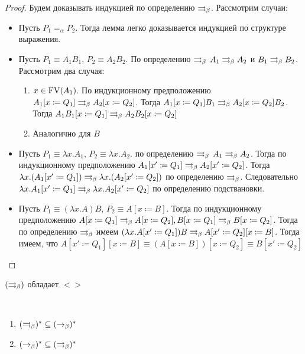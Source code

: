 \begin{proof}
	Будем доказывать индукцией по определению $\rightrightarrows_{\beta} $. Рассмотрим случаи:
	\begin{itemize}
		\item Пусть $P_{1}=_{\alpha}P_{2}$. Тогда лемма легко доказывается индукцией по структуре выражения.
		\item Пусть $P_{1}\equiv{}A_{1}B_{1}$, $P_{2}\equiv{}A_{2}B_{2}$. По определению $\rightrightarrows_{\beta}$ $A_{1} \rightrightarrows_{\beta} A_{2}$ и $B_{1} \rightrightarrows_{\beta} B_{2}$.
		Рассмотрим два случая:
		\begin{enumerate}
			\item $x \in \operatorname{FV}(A_{1})$. По индукционному предположению $A_{1}[x\coloneqq{}Q_{1}] \rightrightarrows_{\beta} A_{2}[x\coloneqq{}Q_{2}]$. Тогда $A_{1}[x\coloneqq{}Q_{1}]B_{1} \rightrightarrows_{\beta} A_{2}[x\coloneqq{}Q_{2}]B_{2}$. Тогда $A_{1}B_{1}[x\coloneqq{}Q_{1}] \rightrightarrows_{\beta} A_{2}B_{2}[x\coloneqq{}Q_{2}]$
			\item Аналогично для $B$
		\end{enumerate}
		\item Пусть $P_{1}\equiv{}\lambda{}x.A_{1}$, $P_{2}\equiv{}\lambda{}x.A_{2}$. по определению $\rightrightarrows_{\beta}$ $A_{1}\rightrightarrows_{\beta} A_{2}$. Тогда по индукционному предположению $A_{1}[x'\coloneqq{}Q_{1}] \rightrightarrows_{\beta} A_{2}[x'\coloneqq{}Q_{2}]$. Тогда 
		$\lambda{}x.(A_{1}[x'\coloneqq{}Q_{1}]) \rightrightarrows_{\beta} \lambda{}x.(A_{2}[x'\coloneqq{}Q_{2}])$ по определению $\rightrightarrows_{\beta}$. Следовательно 	$\lambda{}x.A_{1}[x'\coloneqq{}Q_{1}] \rightrightarrows_{\beta} \lambda{}x.A_{2}[x'\coloneqq{}Q_{2}]$ по определению подствановки.
		\item Пусть $P_{1}\equiv(\lambda{}x.A)B$, $P_{2}\equiv A[x\coloneqq{}B]$. Тогда по индукционному предположению $A[x\coloneq{}Q_{1}] \rightrightarrows_{\beta} A[x\coloneqq{}Q_{2}], B[x\coloneq{}Q_{1}] \rightrightarrows_{\beta} B[x\coloneqq{}Q_{2}]$. Тогда по определению $\rightrightarrows_{\beta}$ имеем $(\lambda{}x.A[x'\coloneqq{}Q_1])B \rightrightarrows_{\beta} A[x'\coloneqq{}Q_2][x\coloneqq{}B]$. Тогда имеем, что $A[x'\coloneqq{}Q_1][x\coloneqq{}B] \equiv (A[x\coloneqq{}B])[x\coloneqq{}Q_2] \equiv B[x'\coloneqq{}Q_{2}]$
	\end{itemize}
\end{proof}

\begin{lemma}
	$(\rightrightarrows_{\beta} )$ обладает $<>$
\end{lemma}



\begin{lemma}
	\
	\begin{enumerate}
		\item $(\rightrightarrows_{\beta} )^{*} \subseteq (\to_{\beta})^{*}$
		\item $(\to_{\beta})^{*} \subseteq (\rightrightarrows_{\beta} )^{*}$
	\end{enumerate}
\end{lemma}

